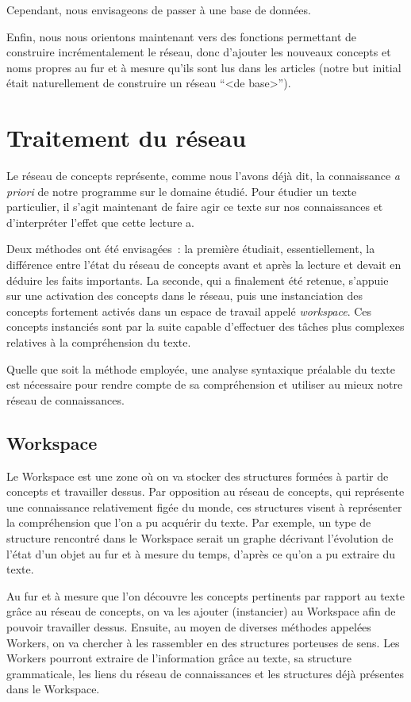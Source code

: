 \documentclass[a4paper, 12pt]{article}
\begin{document}
Cependant, nous envisageons de passer à une base de données.

Enfin, nous nous orientons maintenant vers des fonctions permettant de construire incrémentalement le réseau, donc d'ajouter les nouveaux concepts et noms propres au fur et à mesure qu'ils sont lus dans les articles (notre but initial était naturellement de construire un réseau ``<de base>'').

\section{Traitement du réseau}

Le réseau de concepts représente, comme nous l'avons déjà dit, la connaissance \textit{a priori} de notre programme sur le domaine étudié. Pour étudier un texte particulier, il s'agit maintenant de faire agir ce texte sur nos connaissances et d'interpréter l'effet que cette lecture a.

Deux méthodes ont été envisagées~: la première étudiait, essentiellement, la différence entre l'état du réseau de concepts avant et après la lecture et devait en déduire les faits importants. La seconde, qui a finalement été retenue, s'appuie sur une activation des concepts dans le réseau, puis une instanciation des concepts fortement activés dans un espace de travail appelé \textit{workspace}. Ces concepts instanciés sont par la suite capable d'effectuer des tâches plus complexes relatives à la compréhension du texte.

Quelle que soit la méthode employée, une analyse syntaxique préalable du texte est nécessaire pour rendre compte de sa compréhension et utiliser au mieux notre réseau de connaissances.

\subsection{Workspace}
Le Workspace est une zone où on va stocker des structures formées à partir de concepts et travailler dessus. Par opposition au réseau de concepts, qui représente une connaissance relativement figée du monde, ces structures visent à représenter la compréhension que l'on a pu acquérir du texte.
Par exemple, un type de structure rencontré dans le Workspace serait un graphe décrivant l'évolution de l'état d'un objet au fur et à mesure du temps, d'après ce qu'on a pu extraire du texte.

Au fur et à mesure que l'on découvre les concepts pertinents par rapport au texte grâce au réseau de concepts, on va les ajouter (instancier) au Workspace afin de pouvoir travailler dessus. Ensuite, au moyen de diverses méthodes appelées Workers, on va chercher à les rassembler en des structures porteuses de sens. Les Workers pourront extraire de l'information grâce au texte, sa structure grammaticale, les liens du réseau de connaissances et les structures déjà présentes dans le Workspace.
\end{document}
